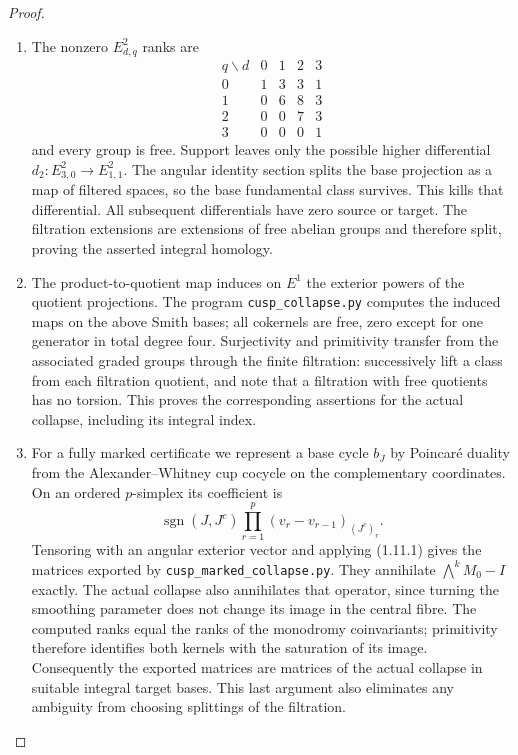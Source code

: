 \documentclass[11pt,a4paper]{article}
\theoremstyle{definition}
\begin{document}
\begin{proof}
\begin{enumerate}[label=\arabic*.]
\item The nonzero $E^2_{d,q}$ ranks are
\[
\begin{array}{c|rrrr}
q\backslash d&0&1&2&3\\\hline
0&1&3&3&1\\
1&0&6&8&3\\
2&0&0&7&3\\
3&0&0&0&1
\end{array}
\]
and every group is free.  Support leaves only the possible higher
differential $d_2:E^2_{3,0}\to E^2_{1,1}$.
The angular identity section splits the base projection as a map of
filtered spaces, so the base fundamental class survives.  This kills
that differential.  All subsequent differentials have zero source or
target.  The filtration extensions are extensions of free abelian
groups and therefore split, proving the asserted integral homology.

\item The product-to-quotient map induces on $E^1$ the exterior powers of
the quotient projections.  The program \texttt{cusp\_collapse.py}
computes the induced maps on the above Smith bases; all cokernels are
free, zero except for one generator in total degree four.
Surjectivity and primitivity transfer from the associated graded
groups through the finite filtration: successively lift a class from
each filtration quotient, and note that a filtration with free
quotients has no torsion.  This proves the corresponding assertions
for the actual collapse, including its integral index.

\item For a fully marked certificate we represent a base cycle $b_J$ by
Poincar\'e duality from the Alexander--Whitney cup cocycle on the
complementary coordinates.  On an ordered $p$-simplex its coefficient
is
\[
\operatorname{sgn}(J,J^c)
 \prod_{r=1}^p(v_r-v_{r-1})_{(J^c)_r}.
\]
Tensoring with an angular exterior vector and applying (1.11.1)
gives the matrices exported by \texttt{cusp\_marked\_collapse.py}.
They annihilate $\bigwedge^kM_0-I$ exactly.  The actual collapse also
annihilates that operator, since turning the smoothing parameter
does not change its image in the central fibre.  The computed ranks
equal the ranks of the monodromy coinvariants; primitivity therefore
identifies both kernels with the saturation of its image.
Consequently the exported matrices are matrices of the actual
collapse in suitable integral target bases.  This last argument also
eliminates any ambiguity from choosing splittings of the filtration.

\end{enumerate}
\end{proof}
\end{document}
